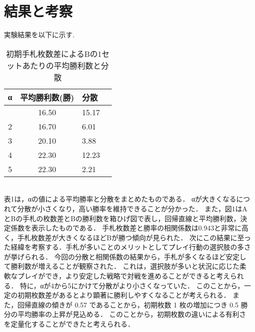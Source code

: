 \documentclass[twocolumn]{ltjsarticle}
\begin{document}
\section{結果と考察}
\small{
  実験結果を以下に示す.
}
\begin{table}[h]
  \centering
  \caption{初期手札枚数差によるBの1セットあたりの平均勝利数と分散}
  \begin{tabular}{clll}
    α &平均勝利数(勝)& 分散\\
    \hline \hline
    \centering
    1&\multicolumn{1}{c}{16.50}&\multicolumn{1}{l}{15.17}\\
    2&\multicolumn{1}{c}{16.70}&\multicolumn{1}{l}{6.01}\\
    3&\multicolumn{1}{c}{20.10}&\multicolumn{1}{l}{3.88}\\
    4&\multicolumn{1}{c}{22.30}&\multicolumn{1}{l}{12.23}\\
    5&\multicolumn{1}{c}{22.30}&\multicolumn{1}{l}{2.21}\\
    \hline%
  \end{tabular}
\end{table}
\begin{minipage}
  
\end{minipage}
\small{\leavevmode\\
表1は，αの値による平均勝率と分散をまとめたものである．
αが大きくなるにつれて分散が小さくなり，高い勝率を維持できることが分かった．
また，図1はAとBの手札の枚数差とBの勝利数を箱ひげ図で表し，回帰直線と平均勝利数，決定係数を表示したものである．
手札枚数差と勝率の相関係数は0.943と非常に高く，手札枚数差が大きくなるほどBが勝つ傾向が見られた．
次にこの結果に至った経緯を考察する．手札が多いことのメリットとしてプレイ行動の選択肢の多さが挙げられる．
今回の分散と相関係数の結果から，手札が多くなるほど安定して勝利数が増えることが観察された．
これは，選択肢が多いと状況に応じた柔軟なプレイができ，より安定した戦略で対戦を進めることができると考えられる．
特に，αが4から5にかけて分散がより小さくなっていた．
このことから，一定の初期枚数差があるとより顕著に勝利しやすくなることが考えられる．
また，回帰直線の傾きが 0.57 であることから，初期枚数 1 枚の増加につき 0.5 勝分の平均勝率の上昇が見込める．
このことから，初期枚数の違いによる有利さを定量化することができたと考えられる．
}
\end{document}
